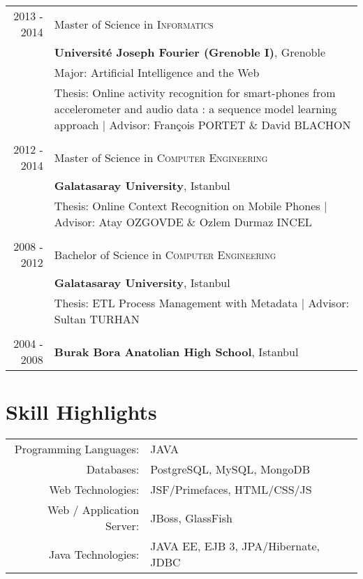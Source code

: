 \documentclass[a4paper,10pt]{article} %
\begin{document}
\begin{tabular}{r|p{14cm}}

\textsc{2013 - 2014} & Master of Science in \textsc{}\textsc{Informatics} \\& \normalsize\textbf{Université Joseph Fourier (Grenoble I)}, Grenoble\\
&  Major: Artificial Intelligence and the Web\\
& Thesis: Online activity recognition for smart-phones from accelerometer and audio data : a sequence model learning approach | \small Advisor: François \textsc{PORTET} \& David \textsc{BLACHON}  \\
&\\



\textsc{2012 - 2014} & Master of Science in \textsc{}\textsc{Computer Engineering} \\& \normalsize\textbf{Galatasaray University}, Istanbul\\
& Thesis: Online Context Recognition on Mobile Phones | \small Advisor: Atay \textsc{OZGOVDE} \& Ozlem Durmaz \textsc{INCEL}  \\
&\\



\textsc{2008 - 2012} & Bachelor of Science in \textsc{}\textsc{Computer Engineering} \\& \normalsize\textbf{Galatasaray University}, Istanbul\\
& Thesis: ETL Process Management with Metadata | \small Advisor: Sultan \textsc{TURHAN}\\
&\\




\textsc{2004 - 2008}& \textbf{Burak Bora Anatolian High School}, Istanbul
\end{tabular}


\section{Skill Highlights}

\begin{tabular}{r|p{13cm}}
Programming Languages:  & JAVA \\
Databases: & PostgreSQL, MySQL, MongoDB  \\
Web Technologies: & JSF/Primefaces,  HTML/CSS/JS\\
Web / Application Server: & JBoss, GlassFish  \\
Java Technologies: & JAVA EE, EJB 3, JPA/Hibernate, JDBC \\

\end{tabular}
\end{document}
